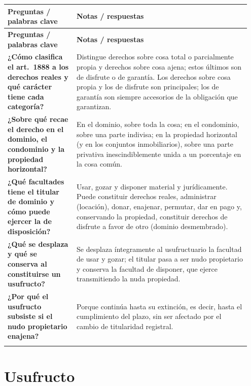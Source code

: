 \documentclass[12pt,oneside]{book}
\makeatletter
\newenvironment{cornell}{%
    \par\vspace{0.5em}
    \noindent
    \begin{longtable}{@{}>{\raggedright\arraybackslash}p{0.27\linewidth}
                         >{\raggedright\arraybackslash}p{0.68\linewidth}@{}}
    \toprule
    \textbf{Preguntas / palabras clave} & \textbf{Notas / respuestas} \\
    \midrule
    \endfirsthead
    \toprule
    \textbf{Preguntas / palabras clave} & \textbf{Notas / respuestas} \\
    \midrule
    \endhead
}{%
    \bottomrule
    \end{longtable}
}
\newcommand{\cornellsummary}[1]{%
    \midrule
    \multicolumn{2}{@{}p{\dimexpr0.95\linewidth+2\tabcolsep\relax}@{}}{%
        \vspace{0.2em}\textbf{Resumen:} #1\vspace{0.2em}} \\
}
\makeatother
\begin{document}
\begin{cornell}
\textbf{¿Cómo clasifica el art.~1888 a los derechos reales y qué carácter tiene cada categoría?} &
Distingue derechos sobre cosa total o parcialmente propia y derechos sobre cosa ajena; estos últimos son de disfrute o de garantía. Los derechos sobre cosa propia y los de disfrute son principales; los de garantía son siempre accesorios de la obligación que garantizan. \\

\textbf{¿Sobre qué recae el derecho en el dominio, el condominio y la propiedad horizontal?} &
En el dominio, sobre toda la cosa; en el condominio, sobre una parte indivisa; en la propiedad horizontal (y en los conjuntos inmobiliarios), sobre una parte privativa inescindiblemente unida a un porcentaje en la cosa común. \\

\textbf{¿Qué facultades tiene el titular de dominio y cómo puede ejercer la de disposición?} &
Usar, gozar y disponer material y jurídicamente. Puede constituir derechos reales, administrar (locación), donar, enajenar, permutar, dar en pago y, conservando la propiedad, constituir derechos de disfrute a favor de otro (dominio desmembrado). \\

\textbf{¿Qué se desplaza y qué se conserva al constituirse un usufructo?} &
Se desplaza íntegramente al usufructuario la facultad de usar y gozar; el titular pasa a ser nudo propietario y conserva la facultad de disponer, que ejerce transmitiendo la nuda propiedad. \\

\textbf{¿Por qué el usufructo subsiste si el nudo propietario enajena?} &
Porque continúa hasta su extinción, es decir, hasta el cumplimiento del plazo, sin ser afectado por el cambio de titularidad registral. \\

\cornellsummary{Los derechos reales se clasifican (art.~1888) en derechos sobre cosa propia y sobre cosa ajena; entre estos últimos, los de disfrute son principales y los de garantía accesorios. El titular de dominio puede usar, gozar y disponer; al constituir derechos sobre cosa ajena desmembra su dominio, que queda imperfecto. En el usufructo el nudo propietario conserva solo la disposición; al extinguirse el derecho se recupera el dominio pleno.}
\end{cornell}

\chapter{Usufructo}\label{cap:usufructo}
\end{document}
